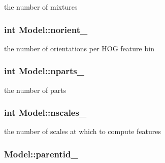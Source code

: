 the number of mixtures 

\hypertarget{class_model_a40c5597450f8efb960bb7da74890e73c}{
\subsubsection[{norient\-\_\-}]{\setlength{\rightskip}{0pt plus 5cm}int Model\-::norient\-\_\-\hspace{0.3cm}{\ttfamily [protected]}}}\label{class_model_a40c5597450f8efb960bb7da74890e73c}


the number of orientations per H\-O\-G feature bin 

\hypertarget{class_model_ae8b3d33dbc43d6ab07c1553c9a1bbc2e}{
\subsubsection[{nparts\-\_\-}]{\setlength{\rightskip}{0pt plus 5cm}int Model\-::nparts\-\_\-\hspace{0.3cm}{\ttfamily [protected]}}}\label{class_model_ae8b3d33dbc43d6ab07c1553c9a1bbc2e}


the number of parts 

\hypertarget{class_model_ab711641b36aa9b8b578acf151af55aa7}{
\subsubsection[{nscales\-\_\-}]{\setlength{\rightskip}{0pt plus 5cm}int Model\-::nscales\-\_\-\hspace{0.3cm}{\ttfamily [protected]}}}\label{class_model_ab711641b36aa9b8b578acf151af55aa7}


the number of scales at which to compute features 

\hypertarget{class_model_a4e1151fe7911f52ec75944eff1b257f4}{
\subsubsection[{parentid\-\_\-}]{ Model\-::parentid\-\_\-\hspace{0.3cm}{\ttfamily [protected]}}}\label{class_model_a4e1151fe7911f52ec75944eff1b257f4}


